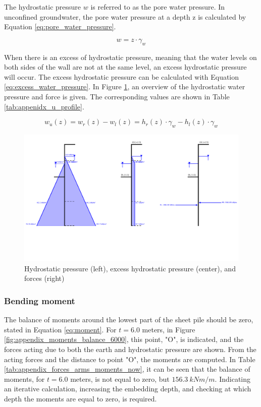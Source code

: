The hydrostatic pressure $w$ is referred to as the pore water pressure. In unconfined groundwater, the pore water pressure at a depth z is calculated by Equation \ref{eq:pore_water_pressure}.

\begin{equation}
    w = z \cdot \gamma_{w}
    \label{eq:pore_water_pressure}
\end{equation}

When there is an excess of hydrostatic pressure, meaning that the water levels on both sides of the wall are not at the same level, an excess hydrostatic pressure will occur. The excess hydrostatic pressure can be calculated with Equation \ref{eq:excess_water_pressure}. In Figure \ref{fig:hydrostatic_excess_pressure}, an overview of the hydrostatic water pressure and force is given. The corresponding values are shown in Table \ref{tab:appenidx_u_profile}. 

\begin{equation}
    w_{u}(z) = w_{r}(z) - w_{l}(z) = h_{r}(z) \cdot \gamma_{w} - h_{l}(z) \cdot \gamma_{w}
    \label{eq:excess_water_pressure}
\end{equation}

\begin{figure}[H]
    \centering
    \includegraphics[width=0.75\linewidth]{figures/ch8/water_overview.png}
    \caption{Hydrostatic pressure (left), excess hydrostatic pressure (center), and forces (right)}
    \label{fig:hydrostatic_excess_pressure}
\end{figure}

\subsubsection{Bending moment}

The balance of moments around the lowest part of the sheet pile should be zero,  stated in Equation \ref{eq:moment}. For $t = 6.0$ meters, in Figure \ref{fig:appendix_moments_balance_6000}, this point, "O", is indicated, and the forces acting due to both the earth and hydrostatic pressure are shown. From the acting forces and the distance to point "O", the moments are computed. In Table \ref{tab:appendix_forces_arms_moments_now}, it can be seen that the balance of moments, for $t = 6.0$ meters, is not equal to zero, but $156.3 \ kNm/m$. Indicating an iterative calculation, increasing the embedding depth, and checking at which depth the moments are equal to zero, is required.

